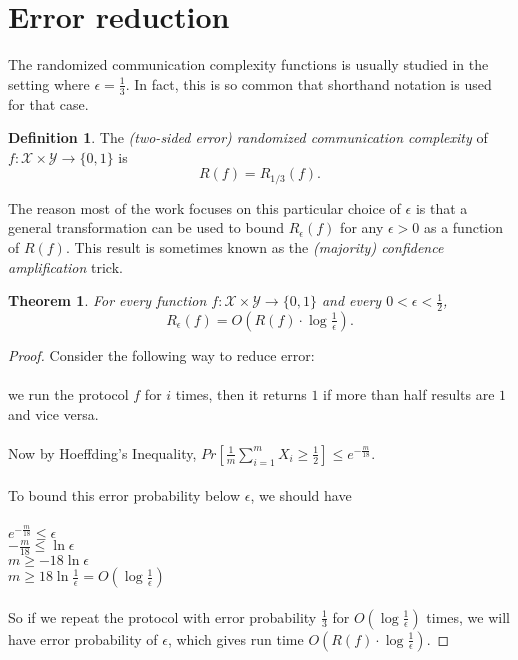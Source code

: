 \documentclass[11pt,oneside]{book}
\theoremstyle{plain}
\newtheorem{theorem}{Theorem}
\theoremstyle{definition}
\newtheorem{definition}{Definition}
\theoremstyle{plain}
\newcommand{\calX}{\mathcal{X}}
\newcommand{\calY}{\mathcal{Y}}
\begin{document}
 
\section{Error reduction}

The randomized communication complexity functions is usually studied in the setting where $\epsilon = \frac13$. In fact, this is so common that shorthand notation is used for that case.

\begin{definition}
	The \emph{(two-sided error) randomized communication complexity} of $f : \calX \times \calY \to \{0,1\}$ is
	\[
	R(f) = R_{1/3}(f).
	\]
\end{definition}

The reason most of the work focuses on this particular choice of $\epsilon$ is that a general transformation can be used to bound $R_\epsilon(f)$ for any $\epsilon > 0$ as a function of $R(f)$. This result is sometimes known as the \emph{(majority) confidence amplification} trick.

\begin{theorem}
	For every function $f : \calX \times \calY \to \{0,1\}$ and every $0 < \epsilon < \frac12$, 
	\[
	R_\epsilon(f) = O\left( R(f) \cdot \log \tfrac1\epsilon \right).
	\]
\end{theorem}

\begin{proof}
	Consider the following way to reduce error: \\
	\\
	we run the protocol $f$ for $i$ times, then it returns $1$ if more than half results are $1$ and vice versa. \\
	\\
	Now by Hoeffding's Inequality, $Pr[\frac{1}{m}\sum_{i=1}^m X_i \ge \frac12] \leq e^{-\frac{m}{18}}$. \\
	\\
	To bound this error probability below $\epsilon$, we should have\\
	\\
	$e^{-\frac{m}{18}} \leq \epsilon$\\
	$-\frac{m}{18} \leq \ln \epsilon$\\
	$m\ge -18\ln \epsilon$ \\
	$m\ge 18\ln \frac{1}{\epsilon} = O(\log\frac{1}{\epsilon})$\\
	\\
	So if we repeat the protocol with error probability $\frac13$ for $O(\log\frac{1}{\epsilon})$ times, we will have error probability of $\epsilon$, which gives run time  $O\left( R(f) \cdot \log \tfrac1\epsilon \right)$.
\end{proof}
\end{document}
